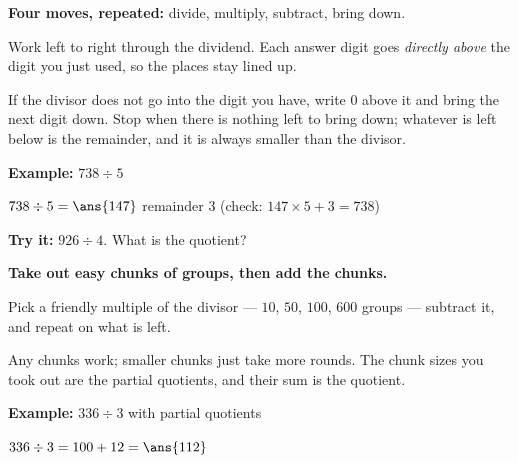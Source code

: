 \documentclass[12pt]{article}
\begin{document}


\begin{formulabox}
\textbf{Four moves, repeated:} divide, multiply, subtract, bring down.\par
Work left to right through the dividend. Each answer digit goes \emph{directly above} the digit you
just used, so the places stay lined up.\par
If the divisor does not go into the digit you have, write $0$ above it and bring the next digit down.
Stop when there is nothing left to bring down; whatever is left below is the remainder, and it is
always smaller than the divisor.
\end{formulabox}

\begin{examplebox}
\textbf{Example:} \quad $738 \div 5$

$738 \div 5 = \ans{147}$ remainder $3$ \quad (check: $147 \times 5 + 3 = 738$)
\end{examplebox}

\begin{tryitbox}
\textbf{Try it:} \quad $926 \div 4$. What is the quotient?\\[2pt]
\end{tryitbox}


\begin{formulabox}
\textbf{Take out easy chunks of groups, then add the chunks.}\par
Pick a friendly multiple of the divisor --- $10$, $50$, $100$, $600$ groups --- subtract it, and repeat
on what is left.\par
Any chunks work; smaller chunks just take more rounds. The chunk sizes you took out are the partial
quotients, and their sum is the quotient.
\end{formulabox}

\begin{examplebox}
\textbf{Example:} \quad $336 \div 3$ with partial quotients

$336 \div 3 = 100 + 12 = \ans{112}$
\end{examplebox}
\end{document}
